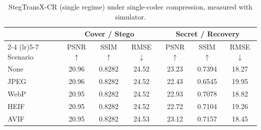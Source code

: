 \begin{table}[t]
\centering
\caption{StegTransX-CR (single regime) under single-codec compression, measured with simulator.}
\label{tab:single-single-sim}
\begin{tabular}{lcccccc}
\toprule
& \multicolumn{3}{c}{Cover / Stego} & \multicolumn{3}{c}{Secret / Recovery} \\
\cmidrule(lr){2-4} \cmidrule(lr){5-7}
Scenario & PSNR $\uparrow$ & SSIM $\uparrow$ & RMSE $\downarrow$ & PSNR $\uparrow$ & SSIM $\uparrow$ & RMSE $\downarrow$ \\
\midrule
None & 20.96 & 0.8282 & 24.52 & 23.23 & 0.7394 & 18.27 \\
JPEG & 20.96 & 0.8282 & 24.52 & 22.43 & 0.6545 & 19.95 \\
WebP & 20.95 & 0.8282 & 24.52 & 22.93 & 0.7078 & 18.82 \\
HEIF & 20.95 & 0.8282 & 24.52 & 22.72 & 0.7104 & 19.26 \\
AVIF & 20.95 & 0.8282 & 24.53 & 23.12 & 0.7157 & 18.45 \\
\bottomrule
\end{tabular}
\end{table}
